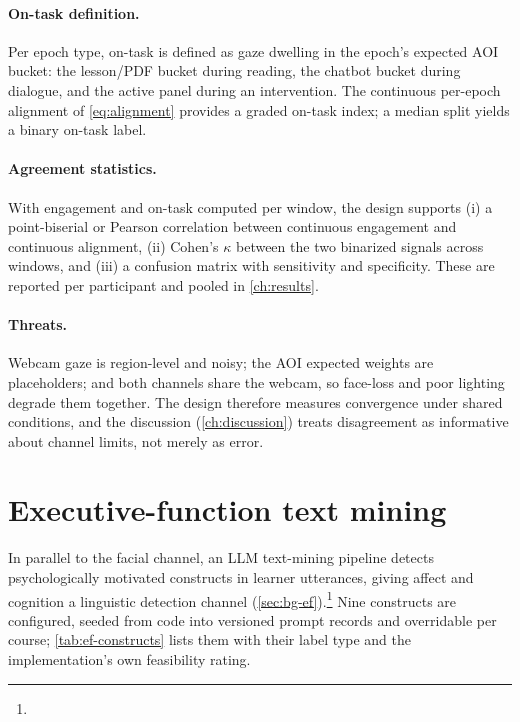\paragraph{On-task definition.} Per epoch type, on-task is defined as gaze
dwelling in the epoch's expected AOI bucket: the lesson/PDF bucket during
reading, the chatbot bucket during dialogue, and the active panel during
an intervention. The continuous per-epoch alignment of
\cref{eq:alignment} provides a graded on-task index; a median split yields
a binary on-task label.

\paragraph{Agreement statistics.} With engagement and on-task computed per
window, the design supports (i) a point-biserial or Pearson correlation
between continuous engagement and continuous alignment, (ii) Cohen's
$\kappa$ \citep{cohen1960} between the two binarized signals across
windows, and (iii) a confusion matrix with sensitivity and specificity.
These are reported per participant and pooled in \cref{ch:results}.

\paragraph{Threats.} Webcam gaze is region-level and noisy; the AOI
expected weights are placeholders; and both channels share the webcam, so
face-loss and poor lighting degrade them together. The design therefore
measures convergence under shared conditions, and the discussion
(\cref{ch:discussion}) treats disagreement as informative about channel
limits, not merely as error.

\section{Executive-function text mining}
\label{sec:methodology-ef}

In parallel to the facial channel, an LLM text-mining pipeline detects
psychologically motivated constructs in learner utterances, giving affect
and cognition a linguistic detection channel
(\cref{sec:bg-ef}).\footnote{} Nine
constructs are configured, seeded from code into versioned prompt records
and overridable per course; \cref{tab:ef-constructs} lists them with their
label type and the implementation's own feasibility rating.

